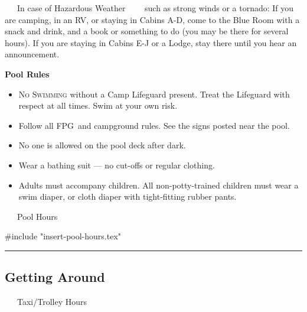 \documentclass[9pt,twoside,openright,final,article]{memoir}
\def\fpg{{\beltanefamily FPG\ }}
\renewcommand{\pfbreakdisplay}{%
  \needspace{24pt}%
  \vspace{8pt}\\\ding{76}\quad\ding{77}\quad\ding{78}\\%
  \vspace{11pt}}
\let\oldsection=\section
\renewcommand{\section}[1]{%
  \vspace{3pt}%
  \needspace{1in}%
  { \hrule } \nopagebreak %
  \begin{center}\oldsection{#1}\end{center}\nopagebreak{}}
\renewcommand{\subsection}[1]{%
  \vspace{6pt}%
  \needspace{1.25in}%
  \begin{center}\textbf{\Large \beltanefamily #1}\end{center}

  \nopagebreak}
\renewcommand{\subsubsection}[1]{%
  \vspace{1pt}\needspace{1.5in}
  {\large ~~~\beltanefamily #1~~~\ }
  \nopagebreak}
\begin{document}
\begin{multicols}{2}
  \subsubsection{In case of Hazardous Weather} such as strong winds or
  a tornado: If you are camping, in an RV, or staying in Cabins A-D,
  come to the Blue Room with a snack and drink, and a book or
  something to do (you may be there for several hours). If you are
  staying in Cabins E-J or a Lodge, stay there until you hear an
  announcement.


  \subsection{Pool Rules}

  \begin{itemize}
  \item \textsc{No Swimming} without a Camp Lifeguard present.
    Treat the Lifeguard
    with respect at all times. Swim at your own risk.
  \item Follow all \fpg and campground rules. See the signs posted
    near the pool.
  \item No one is allowed on the pool deck after dark.
  \item Wear a bathing suit --- no cut-offs or regular clothing.
  \item Adults must accompany children. All non-potty-trained children
    must wear a swim diaper, or cloth diaper with tight-fitting rubber
    pants.
  \end{itemize}

  \subsubsection{Pool Hours}

  #include "insert-pool-hours.tex"


  \pagestyle{headings}
  \thispagestyle{headings}


  \section{Getting Around}


  \subsubsection{Taxi/Trolley Hours}


\end{multicols}
\end{document}
